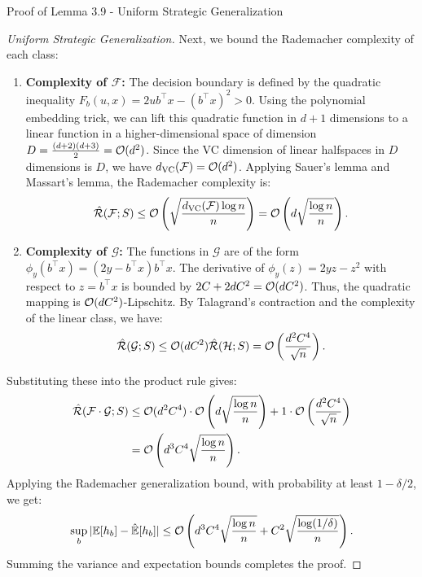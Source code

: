 \begin{sourceblock}{Proof of Lemma 3.9 - Uniform Strategic Generalization}
\begin{proof}[Uniform Strategic Generalization]
Next, we bound the Rademacher complexity of each class:
\begin{enumerate}
    \item \textbf{Complexity of $\mathcal{F}$:} The decision boundary is defined by the quadratic inequality $F_b(u, x) = 2u b^\top x - (b^\top x)^2 > 0$. Using the polynomial embedding trick, we can lift this quadratic function in $d+1$ dimensions to a linear function in a higher-dimensional space of dimension $D = \frac{(d+2)(d+3)}{2} = \mathcal{O}(d^2)$. Since the VC dimension of linear halfspaces in $D$ dimensions is $D$, we have $d_{\mathrm{VC}}(\mathcal{F}) = \mathcal{O}(d^2)$. Applying Sauer's lemma and Massart's lemma, the Rademacher complexity is:
    \begin{equation}
        \hat{\mathcal{R}}(\mathcal{F}; S) \le \mathcal{O}\left( \sqrt{\frac{d_{\mathrm{VC}}(\mathcal{F})\log n}{n}} \right) = \mathcal{O}\left( d\sqrt{\frac{\log n}{n}} \right).
    \end{equation}
    \item \textbf{Complexity of $\mathcal{G}$:} The functions in $\mathcal{G}$ are of the form $\phi_y(b^\top x) = (2y - b^\top x)b^\top x$. The derivative of $\phi_y(z) = 2yz - z^2$ with respect to $z = b^\top x$ is bounded by $2C + 2dC^2 = \mathcal{O}(dC^2)$. Thus, the quadratic mapping is $\mathcal{O}(dC^2)$-Lipschitz. By Talagrand's contraction and the complexity of the linear class, we have:
    \begin{equation}
        \hat{\mathcal{R}}(\mathcal{G}; S) \le \mathcal{O}(dC^2) \hat{\mathcal{R}}(\mathcal{H}; S) = \mathcal{O}\left( \frac{d^2 C^4}{\sqrt{n}} \right).
    \end{equation}
\end{enumerate}
Substituting these into the product rule gives:
\begin{align}
    \hat{\mathcal{R}}(\mathcal{F} \cdot \mathcal{G}; S) &\le \mathcal{O}(d^2 C^4) \cdot \mathcal{O}\left( d\sqrt{\frac{\log n}{n}} \right) + 1 \cdot \mathcal{O}\left( \frac{d^2 C^4}{\sqrt{n}} \right) \nonumber \\
    &= \mathcal{O}\left( d^3 C^4 \sqrt{\frac{\log n}{n}} \right).
    \label{eq:product_class_complexity}
\end{align}
Applying the Rademacher generalization bound, with probability at least $1 - \delta/2$, we get:
\begin{equation}
    \sup_{b} |\mathbb{E}[h_b] - \hat{\mathbb{E}}[h_b]| \le \mathcal{O}\left( d^3 C^4 \sqrt{\frac{\log n}{n}} + C^2\sqrt{\frac{\log(1/\delta)}{n}} \right).
\end{equation}
Summing the variance and expectation bounds completes the proof.
\end{proof}
\end{sourceblock}

